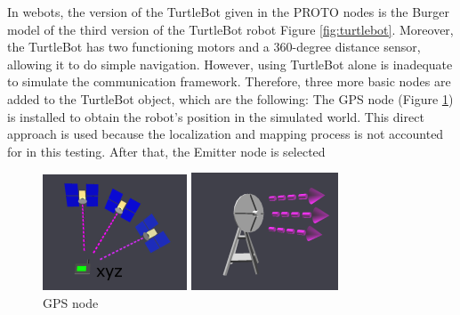 In webots, the version of the TurtleBot given in the PROTO nodes is the Burger model of the third version of the TurtleBot robot Figure \ref{fig:turtlebot}.  Moreover, the TurtleBot has two functioning motors and a 360-degree distance sensor, allowing it to do simple navigation. However, using TurtleBot alone is inadequate to simulate the communication framework. Therefore, three more basic nodes are added to the TurtleBot object, which are the following: The GPS node (Figure \ref{fig:GPS}) is installed to obtain the robot's position in the simulated world. This direct approach is used because the localization and mapping process is not accounted for in this testing. After that, the Emitter node is selected 

\begin{figure}[!htb]
        \includegraphics[width=\linewidth]{progress_report_1/assets/images/communication/devices/gps.png}
        \caption{GPS node}\label{fig:GPS}
    \endminipage\hfill
        \includegraphics[width=\linewidth]{progress_report_1/assets/images/communication/devices/emitter.png}

\end{figure}
